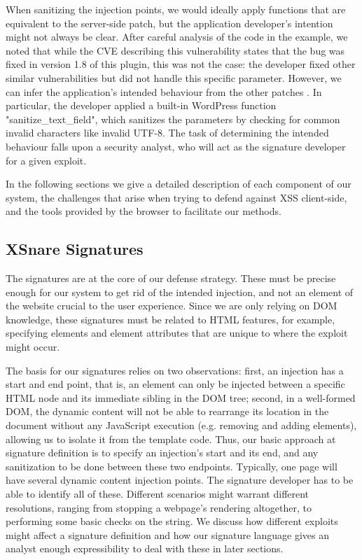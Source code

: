When sanitizing the injection points, we would ideally apply functions that are equivalent to the server-side patch, but the application developer's intention might not always be clear. After careful analysis of the code in the example, we noted that while the CVE describing this vulnerability states that the bug was fixed in version 1.8 of this plugin, this was not the case: the developer fixed other similar vulnerabilities but did not handle this specific parameter. However, we can infer the application's intended behaviour from the other patches \cite{rccpatch}. In particular, the developer applied a built-in WordPress function "sanitize\_text\_field", which sanitizes the parameters by checking for common invalid characters like invalid UTF-8. The task of determining the intended behaviour falls upon a security analyst, who will act as the signature developer for a given exploit.  

In the following sections we give a detailed description of each component of our system, the challenges that arise when trying to defend against XSS client-side, and the tools provided by the browser to facilitate our methods. 
 
 \subsection{XSnare Signatures} \label{signatures}
	 The signatures are at the core of our defense strategy. These must be precise enough for our system to get rid of the intended injection, and not an element of the website crucial to the user experience. Since we are only relying on DOM knowledge, these signatures must be related to HTML features, for example, specifying elements and element attributes that are unique to where the exploit might occur. 
	 
	 The basis for our signatures relies on two observations: first, an injection has a start and end point, that is, an element can only be injected between a specific HTML node and its immediate sibling in the DOM tree; second, in a well-formed DOM, the dynamic content will not be able to rearrange its location in the document without any JavaScript execution (e.g. removing and adding elements), allowing us to isolate it from the template code. Thus, our basic approach at signature definition is to specify an injection's start and its end, and any sanitization to be done between these two endpoints. Typically, one page will have several dynamic content injection points. The signature developer has to be able to identify all of these. Different scenarios might warrant different resolutions, ranging from stopping a webpage's rendering altogether, to performing some basic checks on the string. We discuss how different exploits might affect a signature definition and how our signature language gives an analyst enough expressibility to deal with these in later sections.
	 
